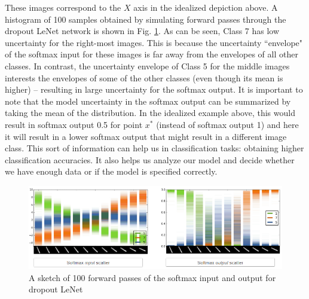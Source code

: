 These images correspond to the $X$ axis in the idealized depiction above. A histogram of 100 samples obtained by simulating forward passes through the dropout LeNet network is shown in Fig. \ref{fig:classification_multi}. As can be seen, Class 7 has low uncertainty for the right-most images. This is because the uncertainty ``envelope" of the softmax input for these images is far away from the envelopes of all other classes. In contrast, the uncertainty envelope of Class 5 for the middle images interests the envelopes of some of the other classes (even though its mean is higher) -- resulting in large uncertainty for the softmax output. It is important to note that the model uncertainty in the softmax output can be summarized by taking the mean of the distribution. In the idealized example above, this would result in softmax output 0.5 for point $x^*$ (instead of softmax output 1) and here it will result in a lower softmax output that might result in a different image class. This sort of information can help us in classification tasks: obtaining higher classification accuracies. It also helps us analyze our model and decide whether we have enough data or if the model is specified correctly.

\begin{figure}[H]
    \centering
    \includegraphics[width=\textwidth]{labs/12/images/Classification_multi.png}
    \caption{A sketch of 100 forward passes of the softmax input and output for dropout LeNet}
    \label{fig:classification_multi}
\end{figure}